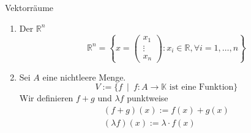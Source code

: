 \begin{example}
    Vektorräume
    \begin{enumerate}
        \item Der $\mathbb{R}^n$
        \[
            \mathbb{R}^n=
            \left\{
            x =
            \begin{pmatrix}
                x_1 \\ \vdots \\ x_n
            \end{pmatrix} :
            x_i\in\mathbb{R}, \forall i = 1, \dots, n
            \right\}
        \]
        \item Sei $A$ eine nichtleere Menge.
        \[
            V := \{ f\ \mid\ f: A\to\mathbb{K} \text{ ist eine Funktion}\}
        \]
        Wir definieren $f+g$ und $\lambda f$ punktweise
        \begin{gather*}
            (f + g) (x) := f(x) + g(x)\\
            (\lambda f)(x) := \lambda \cdot f(x)
        \end{gather*}
    \end{enumerate}
\end{example}